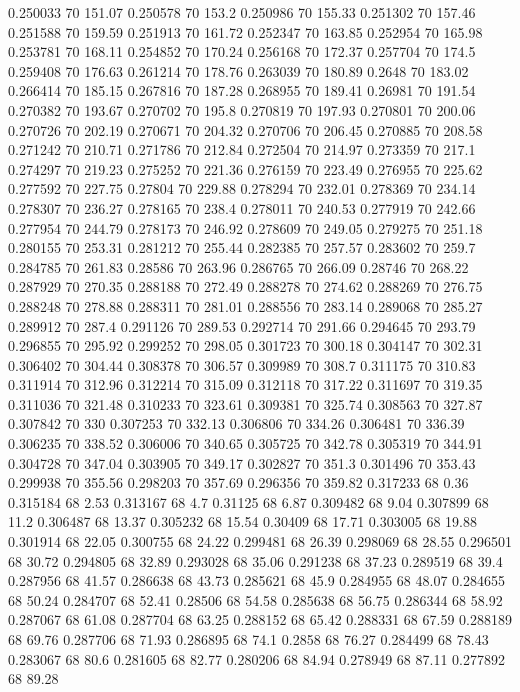 0.250033 70 151.07
0.250578 70 153.2
0.250986 70 155.33
0.251302 70 157.46
0.251588 70 159.59
0.251913 70 161.72
0.252347 70 163.85
0.252954 70 165.98
0.253781 70 168.11
0.254852 70 170.24
0.256168 70 172.37
0.257704 70 174.5
0.259408 70 176.63
0.261214 70 178.76
0.263039 70 180.89
0.2648 70 183.02
0.266414 70 185.15
0.267816 70 187.28
0.268955 70 189.41
0.26981 70 191.54
0.270382 70 193.67
0.270702 70 195.8
0.270819 70 197.93
0.270801 70 200.06
0.270726 70 202.19
0.270671 70 204.32
0.270706 70 206.45
0.270885 70 208.58
0.271242 70 210.71
0.271786 70 212.84
0.272504 70 214.97
0.273359 70 217.1
0.274297 70 219.23
0.275252 70 221.36
0.276159 70 223.49
0.276955 70 225.62
0.277592 70 227.75
0.27804 70 229.88
0.278294 70 232.01
0.278369 70 234.14
0.278307 70 236.27
0.278165 70 238.4
0.278011 70 240.53
0.277919 70 242.66
0.277954 70 244.79
0.278173 70 246.92
0.278609 70 249.05
0.279275 70 251.18
0.280155 70 253.31
0.281212 70 255.44
0.282385 70 257.57
0.283602 70 259.7
0.284785 70 261.83
0.28586 70 263.96
0.286765 70 266.09
0.28746 70 268.22
0.287929 70 270.35
0.288188 70 272.49
0.288278 70 274.62
0.288269 70 276.75
0.288248 70 278.88
0.288311 70 281.01
0.288556 70 283.14
0.289068 70 285.27
0.289912 70 287.4
0.291126 70 289.53
0.292714 70 291.66
0.294645 70 293.79
0.296855 70 295.92
0.299252 70 298.05
0.301723 70 300.18
0.304147 70 302.31
0.306402 70 304.44
0.308378 70 306.57
0.309989 70 308.7
0.311175 70 310.83
0.311914 70 312.96
0.312214 70 315.09
0.312118 70 317.22
0.311697 70 319.35
0.311036 70 321.48
0.310233 70 323.61
0.309381 70 325.74
0.308563 70 327.87
0.307842 70 330
0.307253 70 332.13
0.306806 70 334.26
0.306481 70 336.39
0.306235 70 338.52
0.306006 70 340.65
0.305725 70 342.78
0.305319 70 344.91
0.304728 70 347.04
0.303905 70 349.17
0.302827 70 351.3
0.301496 70 353.43
0.299938 70 355.56
0.298203 70 357.69
0.296356 70 359.82
0.317233 68 0.36
0.315184 68 2.53
0.313167 68 4.7
0.31125 68 6.87
0.309482 68 9.04
0.307899 68 11.2
0.306487 68 13.37
0.305232 68 15.54
0.30409 68 17.71
0.303005 68 19.88
0.301914 68 22.05
0.300755 68 24.22
0.299481 68 26.39
0.298069 68 28.55
0.296501 68 30.72
0.294805 68 32.89
0.293028 68 35.06
0.291238 68 37.23
0.289519 68 39.4
0.287956 68 41.57
0.286638 68 43.73
0.285621 68 45.9
0.284955 68 48.07
0.284655 68 50.24
0.284707 68 52.41
0.28506 68 54.58
0.285638 68 56.75
0.286344 68 58.92
0.287067 68 61.08
0.287704 68 63.25
0.288152 68 65.42
0.288331 68 67.59
0.288189 68 69.76
0.287706 68 71.93
0.286895 68 74.1
0.2858 68 76.27
0.284499 68 78.43
0.283067 68 80.6
0.281605 68 82.77
0.280206 68 84.94
0.278949 68 87.11
0.277892 68 89.28
